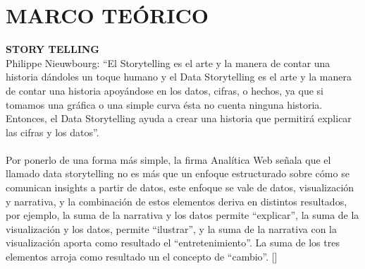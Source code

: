 \documentclass[preprint,12pt]{elsarticle}
\begin{document}
	\section{MARCO TEÓRICO}
	\textbf{ STORY TELLING}\\
	
	Philippe Nieuwbourg: “El Storytelling es el arte y la manera de contar una historia dándoles un toque humano y el Data Storytelling es el arte y la manera de contar una historia apoyándose en los datos, cifras, o hechos, ya que si tomamos una gráfica o una simple curva ésta no cuenta ninguna historia. Entonces, el Data Storytelling ayuda a crear una historia que permitirá explicar las cifras y los datos”. \\
	\\
	Por ponerlo de una forma más simple, la firma Analítica Web señala que el llamado data storytelling no es más que un enfoque estructurado sobre cómo se comunican insights a partir de datos, este enfoque se vale de datos, visualización y narrativa, y la combinación de estos elementos deriva en distintos resultados, por ejemplo, la suma de la narrativa y los datos permite “explicar”, la suma de la visualización y los datos, permite “ilustrar”, y la suma de la narrativa con la visualización aporta como resultado el “entretenimiento”. La suma de los tres elementos arroja como resultado un el concepto de “cambio”. []\\
	

	
	
	
	
	
\end{document}
